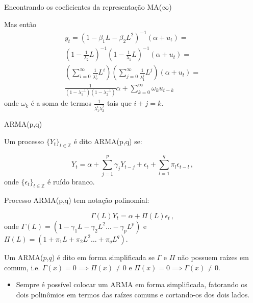 \documentclass[11pt]{beamer}
\newenvironment{halfwideitemize}{\itemize\addtolength{\itemsep}{0.5em}}{\enditemize}
\begin{document}
\begin{frame}{Encontrando os coeficientes da representação MA($\infty$)}
	\begin{halfwideitemize}
		\item Mas então 
		\begin{equation}
			\begin{aligned}
				y_t = (1-\beta_1 L - \beta_2 L^2)^{-1}(\alpha + u_t) = \\ \left(1-\frac{1}{\lambda_2}L\right)^{-1}\left(1- \frac{1}{\lambda_1}L\right)^{-1}(\alpha+u_t) = \\
				 \left(\sum_{i=0}^\infty \frac{1}{\lambda_2^i} L^i\right) \left(\sum_{j=0}^\infty \frac{1}{\lambda_1^j}L^j\right)(\alpha + u_t) =\\
				 \frac{1}{(1-\lambda_1^{-1})(1-\lambda_2^{-1})}\alpha + \sum_{k=0}^\infty \omega_k u_{t-k} \end{aligned}
		\end{equation}
		onde $\omega_k$ é a soma de termos $\frac{1}{\lambda^i_1 \lambda^j_2}$ tais que $i+j=k$. 
	\end{halfwideitemize}
\end{frame}

\begin{frame}{ARMA(p,q)}
	
	\begin{halfwideitemize}
		\item Um processo $\{Y_t\}_{t \in \mathbb{Z}}$ é dito ARMA(p,q) se:
		
		$$Y_t = \alpha + \sum_{j=1}^p \gamma_j Y_{t-j} + \epsilon_t + \sum_{l=1}^q \pi_l \epsilon_{t-l} \, ,$$
		onde $\{\epsilon_t\}_{t \in \mathbb{Z}}$ é ruído branco.
		
		\item Processo ARMA(p,q) tem notação polinomial:
		
		$$\Gamma(L)Y_t = \alpha + \Pi(L)\epsilon_t \, ,$$
		onde $\Gamma(L) = (1-\gamma_1L -\gamma_2 L^2 \ldots -\gamma_p L^p)$ e $\Pi(L) = (1+\pi_1L +\pi_2 L^2 \ldots +\pi_q L^q)$.
			\item Um ARMA($p$,$q$) é dito em {\color{blue}forma simplificada} se $\Gamma$ e $\Pi$ não possuem raízes em comum, i.e. $\Gamma(x) =0 \implies \Pi(x) \neq 0$ e $\Pi(x) = 0 \implies \Gamma(x) \neq 0$.
		
		\begin{itemize}
			\item Sempre é possível colocar um ARMA em forma simplificada, fatorando os dois polinômios em termos das raízes comuns e cortando-os dos dois lados.
		\end{itemize}
	
	\end{halfwideitemize}
\end{frame}
\end{document}
